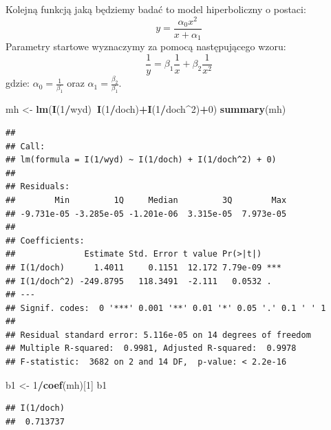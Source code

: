\documentclass[polish,]{book}
\newenvironment{Shaded}{\begin{snugshade}}{\end{snugshade}}
\newcommand{\DecValTok}[1]{\textcolor[rgb]{0.00,0.00,0.81}{#1}}
\newcommand{\KeywordTok}[1]{\textcolor[rgb]{0.13,0.29,0.53}{\textbf{#1}}}
\newcommand{\NormalTok}[1]{#1}
\newcommand{\OperatorTok}[1]{\textcolor[rgb]{0.81,0.36,0.00}{\textbf{#1}}}
\newcommand{\StringTok}[1]{\textcolor[rgb]{0.31,0.60,0.02}{#1}}
\begin{document}
Kolejną funkcją jaką będziemy badać to model hiperboliczny o postaci:
\begin{equation}
y=\frac{\alpha_0x^2}{x+\alpha_1}
\label{eq:wz1330}
\end{equation}
Parametry startowe wyznaczymy za pomocą następującego wzoru:
\begin{equation}
\frac{1}{y}=\beta_1\frac{1}{x}+\beta_2\frac{1}{x^2}
\label{eq:wz1331}
\end{equation}
gdzie: \(\alpha_0=\frac{1}{\beta_1}\) oraz \(\alpha_1=\frac{\beta_2}{\beta_1}\).

\begin{Shaded}
\begin{Highlighting}[]
\NormalTok{mh <-}\StringTok{ }\KeywordTok{lm}\NormalTok{(}\KeywordTok{I}\NormalTok{(}\DecValTok{1}\OperatorTok{/}\NormalTok{wyd)}\OperatorTok{~}\KeywordTok{I}\NormalTok{(}\DecValTok{1}\OperatorTok{/}\NormalTok{doch)}\OperatorTok{+}\KeywordTok{I}\NormalTok{(}\DecValTok{1}\OperatorTok{/}\NormalTok{doch}\OperatorTok{^}\DecValTok{2}\NormalTok{)}\OperatorTok{+}\DecValTok{0}\NormalTok{)}
\KeywordTok{summary}\NormalTok{(mh)}
\end{Highlighting}
\end{Shaded}

\begin{verbatim}
## 
## Call:
## lm(formula = I(1/wyd) ~ I(1/doch) + I(1/doch^2) + 0)
## 
## Residuals:
##        Min         1Q     Median         3Q        Max 
## -9.731e-05 -3.285e-05 -1.201e-06  3.315e-05  7.973e-05 
## 
## Coefficients:
##              Estimate Std. Error t value Pr(>|t|)    
## I(1/doch)      1.4011     0.1151  12.172 7.79e-09 ***
## I(1/doch^2) -249.8795   118.3491  -2.111   0.0532 .  
## ---
## Signif. codes:  0 '***' 0.001 '**' 0.01 '*' 0.05 '.' 0.1 ' ' 1
## 
## Residual standard error: 5.116e-05 on 14 degrees of freedom
## Multiple R-squared:  0.9981, Adjusted R-squared:  0.9978 
## F-statistic:  3682 on 2 and 14 DF,  p-value: < 2.2e-16
\end{verbatim}

\begin{Shaded}
\begin{Highlighting}[]
\NormalTok{b1 <-}\StringTok{ }\DecValTok{1}\OperatorTok{/}\KeywordTok{coef}\NormalTok{(mh)[}\DecValTok{1}\NormalTok{]}
\NormalTok{b1}
\end{Highlighting}
\end{Shaded}

\begin{verbatim}
## I(1/doch) 
##  0.713737
\end{verbatim}
\end{document}
